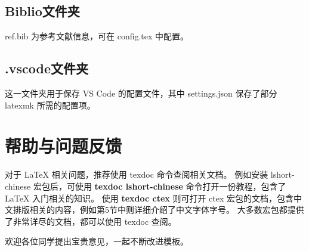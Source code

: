 \subsection{Biblio文件夹}

ref.bib 为参考文献信息，可在 config.tex 中配置。

\subsection{.vscode文件夹}

这一文件夹用于保存 VS Code 的配置文件，其中 settings.json 保存了部分 latexmk 所需的配置项。



\section{帮助与问题反馈}\label{sec:help}

对于 \LaTeX{} 相关问题，推荐使用 texdoc 命令查阅相关文档。
例如安装 lshort-chinese 宏包后，可使用 \textbf{texdoc lshort-chinese} 命令打开一份教程，包含了 \LaTeX{} 入门相关的知识。
使用 \textbf{texdoc ctex} 则可打开 ctex 宏包的文档，包含中文排版相关的内容，例如第5节中则详细介绍了中文字体字号。
大多数宏包都提供了非常详尽的文档，都可以使用 texdoc 查阅。

欢迎各位同学提出宝贵意见，一起不断改进模板。
